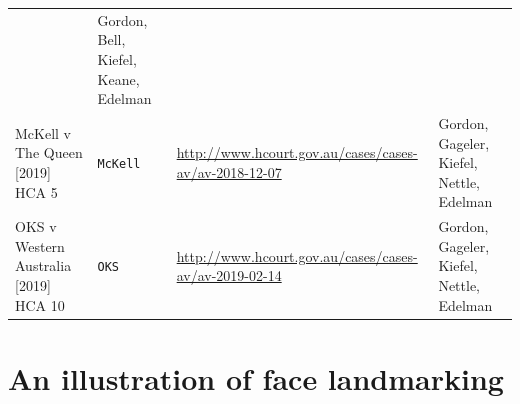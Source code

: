 \documentclass{monashthesis}
\begin{document}
\begin{longtable}[]{@{}llll@{}}
\begin{minipage}[t]{0.30\columnwidth}
\end{minipage} & \begin{minipage}[t]{0.22\columnwidth}\raggedright
Gordon, Bell, Kiefel, Keane, Edelman\strut
\end{minipage}\tabularnewline
\begin{minipage}[t]{0.22\columnwidth}\raggedright
McKell v The Queen {[}2019{]} HCA 5\strut
\end{minipage} & \begin{minipage}[t]{0.15\columnwidth}\raggedright
\texttt{McKell}\strut
\end{minipage} & \begin{minipage}[t]{0.30\columnwidth}\raggedright
\url{http://www.hcourt.gov.au/cases/cases-av/av-2018-12-07}\strut
\end{minipage} & \begin{minipage}[t]{0.22\columnwidth}\raggedright
Gordon, Gageler, Kiefel, Nettle, Edelman\strut
\end{minipage}\tabularnewline
\begin{minipage}[t]{0.22\columnwidth}\raggedright
OKS v Western Australia {[}2019{]} HCA 10\strut
\end{minipage} & \begin{minipage}[t]{0.15\columnwidth}\raggedright
\texttt{OKS}\strut
\end{minipage} & \begin{minipage}[t]{0.30\columnwidth}\raggedright
\url{http://www.hcourt.gov.au/cases/cases-av/av-2019-02-14}\strut
\end{minipage} & \begin{minipage}[t]{0.22\columnwidth}\raggedright
Gordon, Gageler, Kiefel, Nettle, Edelman\strut
\end{minipage}\tabularnewline
\bottomrule
\end{longtable}

\hypertarget{an-illustration-of-face-landmarking}{%
\section{An illustration of face landmarking}\label{an-illustration-of-face-landmarking}}
\end{document}
